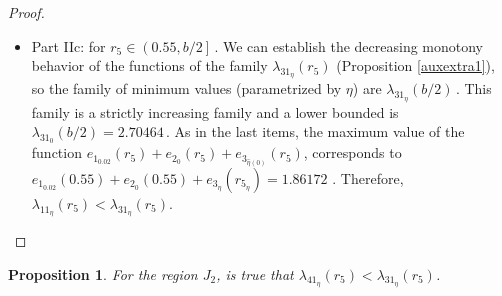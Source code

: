 \documentclass[final,11pt]{article}
\numberwithin{equation}{section}
\newtheorem{proposition}[theorem]{Proposition}
\theoremstyle{definition}
\begin{document}
\begin{proof}
\begin{itemize}
\begin{itemize}
\item Part IIc: for $r_{5}\in\left(0.55,b/2\right]$\,. We can establish the decreasing monotony behavior of the functions of the family $\lambda_{31_{\eta}}(r_{5})$ (Proposition \ref{auxextra1}), so the family of minimum values (parametrized by $\eta$) are $\lambda_{31_{\eta}}(b/2)$\,. This family is a strictly increasing family and a lower bounded is $\lambda_{31_{0}}\left(b/2\right)=2.70464$\,. As in the last items, the maximum value of the function $e_{1_{0.02}}(r_{5})+e_{2_{0}}(r_{5})+e_{3_{\hat{\eta}(0)}}(r_{5})$, corresponds to \mbox{$e_{1_{0.02}}(0.55)+e_{2_{0}}(0.55)+e_{3_{\eta}}(r_{5_{\eta}})=1.86172$}\,\,. Therefore, $\lambda_{11_{\eta}}(r_{5})<\lambda_{31_{\eta}}(r_{5})$.
\end{itemize}
\end{itemize}
\end{proof}

\begin{proposition}\label{proposicionJ2}
For the region $J_{2}$, is true that $\lambda_{41_{\eta}}(r_{5})<\lambda_{31_{\eta}}(r_{5})$.
\end{proposition}
\end{document}
